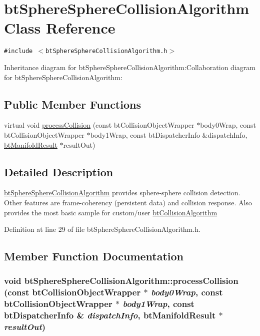 \hypertarget{classbt_sphere_sphere_collision_algorithm}{
\section{btSphereSphereCollisionAlgorithm Class Reference}
\label{classbt_sphere_sphere_collision_algorithm}
}
{\tt \#include $<$btSphereSphereCollisionAlgorithm.h$>$}

Inheritance diagram for btSphereSphereCollisionAlgorithm:Collaboration diagram for btSphereSphereCollisionAlgorithm:\subsection*{Public Member Functions}
\begin{CompactItemize}
\item 
virtual void \hyperlink{classbt_sphere_sphere_collision_algorithm_7e5adac437f8c0cdb738360d5946a65d}{processCollision} (const btCollisionObjectWrapper $\ast$body0Wrap, const btCollisionObjectWrapper $\ast$body1Wrap, const btDispatcherInfo \&dispatchInfo, \hyperlink{classbt_manifold_result}{btManifoldResult} $\ast$resultOut)
\end{CompactItemize}


\subsection{Detailed Description}
\hyperlink{classbt_sphere_sphere_collision_algorithm}{btSphereSphereCollisionAlgorithm} provides sphere-sphere collision detection. Other features are frame-coherency (persistent data) and collision response. Also provides the most basic sample for custom/user \hyperlink{classbt_collision_algorithm}{btCollisionAlgorithm} 

Definition at line 29 of file btSphereSphereCollisionAlgorithm.h.

\subsection{Member Function Documentation}
\hypertarget{classbt_sphere_sphere_collision_algorithm_7e5adac437f8c0cdb738360d5946a65d}{
\subsubsection[processCollision]{\setlength{\rightskip}{0pt plus 5cm}void btSphereSphereCollisionAlgorithm::processCollision (const btCollisionObjectWrapper $\ast$ {\em body0Wrap}, \/  const btCollisionObjectWrapper $\ast$ {\em body1Wrap}, \/  const btDispatcherInfo \& {\em dispatchInfo}, \/  {\bf btManifoldResult} $\ast$ {\em resultOut})}}
\label{classbt_sphere_sphere_collision_algorithm_7e5adac437f8c0cdb738360d5946a65d}




